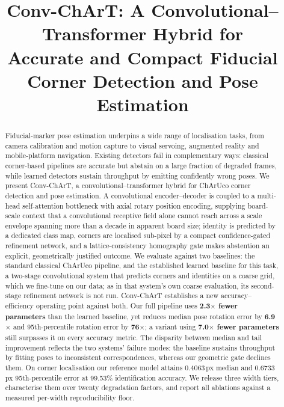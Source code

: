 \documentclass[10pt,twocolumn,letterpaper]{article}
\title{\vspace{-1.5em}\textbf{Conv-ChArT: A Convolutional--Transformer Hybrid for\\
Accurate and Compact Fiducial Corner Detection and Pose Estimation}\vspace{-0.5em}}
\author{}
\date{}
\begin{document}
\onecolumn
\maketitle
\thispagestyle{empty}
\vspace{2em}
\begin{abstract}
\noindent
Fiducial-marker pose estimation underpins a wide range of localisation tasks, from camera
calibration and motion capture to visual servoing, augmented reality and mobile-platform
navigation. Existing detectors fail in complementary ways: classical corner-based pipelines are
accurate but abstain on a large fraction of degraded frames, while learned detectors sustain
throughput by emitting confidently wrong poses. We present Conv-ChArT, a convolutional--transformer
hybrid for ChArUco corner detection and pose estimation. A convolutional encoder--decoder is
coupled to a multi-head self-attention bottleneck with axial rotary position encoding, supplying
board-scale context that a convolutional receptive field alone cannot reach across a scale envelope
spanning more than a decade in apparent board size; identity is predicted by a dedicated class map,
corners are localised sub-pixel by a compact confidence-gated refinement network, and a
lattice-consistency homography gate makes abstention an explicit, geometrically justified outcome.
We evaluate against two baselines: the standard classical ChArUco pipeline, and the established
learned baseline for this task, a two-stage convolutional system that predicts corners and
identities on a coarse grid, which we fine-tune on our data; as in that system's own coarse
evaluation, its second-stage refinement network is not run.
Conv-ChArT establishes a new accuracy--efficiency operating point against both. Our full pipeline
uses \textbf{2.3$\times$ fewer parameters} than the learned baseline, yet reduces median pose
rotation error by \textbf{6.9$\times$} and 95th-percentile rotation error by \textbf{76$\times$}; a
variant using \textbf{7.0$\times$ fewer parameters} still surpasses it on every accuracy metric.
The disparity between median and tail improvement reflects the two systems' failure modes: the
baseline sustains throughput by fitting poses to inconsistent correspondences, whereas our
geometric gate declines them. On corner localisation our reference model attains 0.4063\,px median
and 0.6733\,px 95th-percentile error at 99.53\% identification accuracy. We release three width
tiers, characterise them over twenty degradation factors, and report all ablations against a
measured per-width reproducibility floor.
\end{abstract}
\clearpage
\twocolumn
\end{document}
